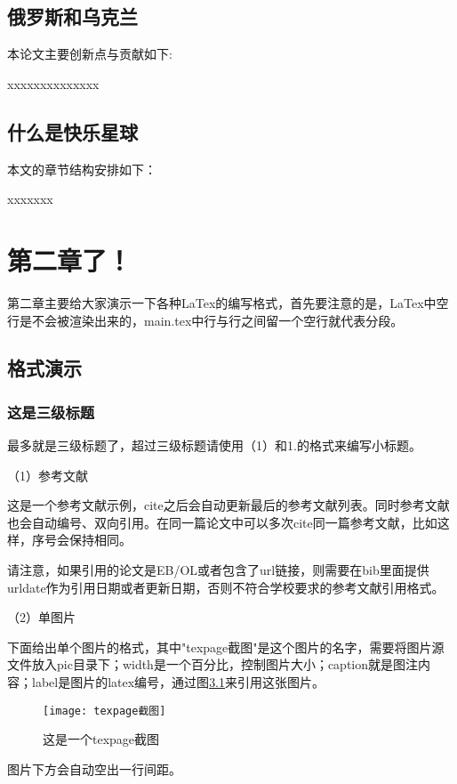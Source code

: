 \documentclass[bachelor]{njupthesis}
\begin{document}
\section{俄罗斯和乌克兰}
本论文主要创新点与贡献如下\cite{荣洁2005俄罗斯民族性格和文化}:

xxxxxxxxxxxxxx


\section{什么是快乐星球}
本文的章节结构安排如下：

xxxxxxx


\chapter{第二章了！}

第二章主要给大家演示一下各种LaTex的编写格式，首先要注意的是，LaTex中空行是不会被渲染出来的，main.tex中行与行之间留一个空行就代表分段。

\section{格式演示}

\subsection{这是三级标题}

最多就是三级标题了，超过三级标题请使用（1）和1.的格式来编写小标题。

（1）参考文献

这是一个参考文献示例\cite{PRODEN}，cite之后会自动更新最后的参考文献列表。同时参考文献也会自动编号、双向引用。在同一篇论文中可以多次cite同一篇参考文献，比如这样\cite{PRODEN}，序号会保持相同。

请注意，如果引用的论文是EB/OL或者包含了url链接，则需要在bib里面提供urldate作为引用日期或者更新日期，否则不符合学校要求的参考文献引用格式。

（2）单图片

下面给出单个图片的格式，其中"{texpage截图}"是这个图片的名字，需要将图片源文件放入pic目录下；width是一个百分比，控制图片大小；caption就是图注内容；label是图片的latex编号，通过图\ref{fig:2}来引用这张图片。
\begin{figure}[htbp]
    \texttt{[image: texpage截图]}
    \caption{这是一个texpage截图}
    \label{fig:2}
\end{figure}

图片下方会自动空出一行间距。
\end{document}

